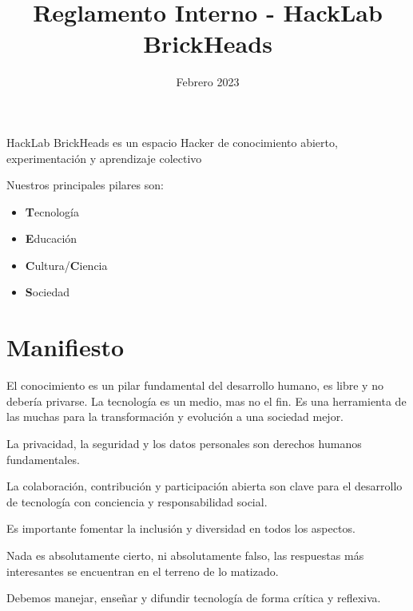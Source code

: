\documentclass[12pt, letterpaper]{article}
\title{Reglamento Interno - HackLab BrickHeads}
\date{Febrero 2023}
\begin{document}
    \maketitle
    \hspace{1cm}
    \begin{center}
        HackLab BrickHeads es un espacio Hacker de conocimiento abierto, 
        experimentación y aprendizaje colectivo
    \end{center}

    Nuestros principales pilares son:
    \begin{itemize}
        \item \textbf{T}ecnología
        \item \textbf{E}ducación
        \item \textbf{C}ultura/\textbf{C}iencia
        \item \textbf{S}ociedad
    \end{itemize}

    \section{Manifiesto}
    El conocimiento es un pilar fundamental del desarrollo humano, es libre y no
    debería privarse.
    La tecnología es un medio, mas no el fin. Es una herramienta de las muchas 
    para la transformación y evolución a una sociedad mejor.

    La privacidad, la seguridad y los datos personales son derechos humanos
    fundamentales.

    La colaboración, contribución y participación abierta son clave para el
    desarrollo de tecnología con conciencia y responsabilidad social.

    Es importante fomentar la inclusión y diversidad en todos los aspectos.

    Nada es absolutamente cierto, ni absolutamente falso, las respuestas más
    interesantes se encuentran en el terreno de lo matizado.

    Debemos manejar, enseñar y difundir tecnología de forma crítica y reflexiva.
\end{document}

